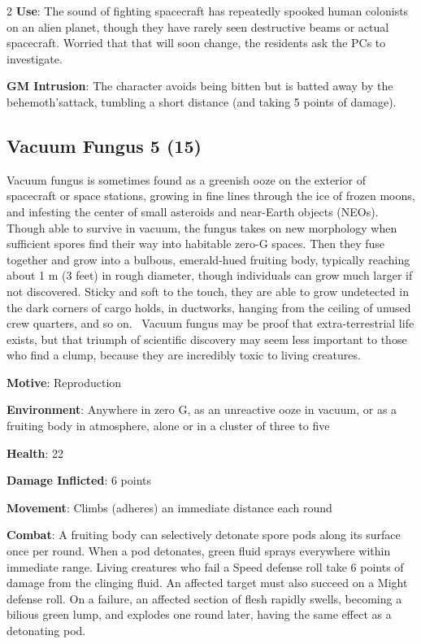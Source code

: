 \begin{multicols}{2}
\textbf{Use}: The sound of fighting spacecraft has repeatedly spooked human colonists on an alien planet, though they have rarely seen destructive beams or actual spacecraft. Worried that that will soon change, the residents ask the PCs to investigate.

\textbf{GM Intrusion}: The character avoids being bitten but is batted away by the behemoth’sattack, tumbling a short distance (and taking 5 points of damage).

\subsection{Vacuum Fungus 5 (15)}

Vacuum fungus is sometimes found as a greenish ooze on the exterior of spacecraft or space stations, growing in fine lines through the ice of frozen moons, and infesting the center of small asteroids and near-Earth objects (NEOs). Though able to survive in vacuum, the fungus takes on new morphology when sufficient spores find their way into habitable zero-G spaces. Then they fuse together and grow into a bulbous, emerald-hued fruiting body, typically reaching about 1 m (3 feet) in rough diameter, though individuals can grow much larger if not discovered. Sticky and soft to the touch, they are able to grow undetected in the dark corners of cargo holds, in ductworks, hanging from the ceiling of unused crew quarters, and so on. 
Vacuum fungus may be proof that extra-terrestrial life exists, but that triumph of scientific discovery may seem less important to those who find a clump, because they are incredibly toxic to living creatures. 

\textbf{Motive}: Reproduction 

\textbf{Environment}: Anywhere in zero G, as an unreactive ooze in vacuum, or as a fruiting body in atmosphere, alone or in a cluster of three to five 

\textbf{Health}: 22 

\textbf{Damage Inflicted}: 6 points 

\textbf{Movement}: Climbs (adheres) an immediate distance each round 

\textbf{Combat}: A fruiting body can selectively detonate spore pods along its surface once per round. When a pod detonates, green fluid sprays everywhere within immediate range. Living creatures who fail a Speed defense roll take 6 points of damage from the clinging fluid. An affected target must also succeed on a Might defense roll. On a failure, an affected section of flesh rapidly swells, becoming a bilious green lump, and explodes one round later, having the same effect as a detonating pod. 


\end{multicols}
